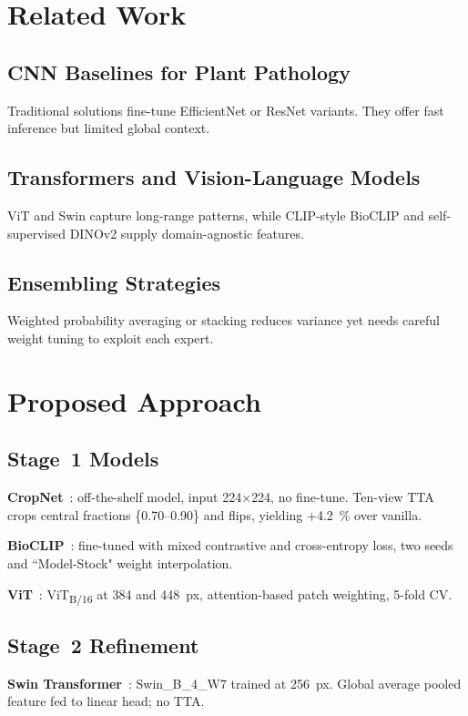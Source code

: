 \documentclass[10pt,conference]{IEEEtran}
\begin{document}
\section{Related Work}
\subsection{CNN Baselines for Plant Pathology}
Traditional solutions fine-tune EfficientNet or ResNet variants.  They offer fast inference but limited global context.

\subsection{Transformers and Vision-Language Models}
ViT and Swin capture long-range patterns, while CLIP-style BioCLIP and self-supervised DINOv2 supply domain-agnostic features.

\subsection{Ensembling Strategies}
Weighted probability averaging or stacking reduces variance yet needs careful weight tuning to exploit each expert.

\section{Proposed Approach}
\subsection{Stage~1 Models}
\textbf{CropNet}~\cite{CropNet2021}: off-the-shelf model, input 224$\times$224, no fine-tune.  Ten-view TTA crops central fractions \{0.70--0.90\} and flips, yielding +4.2~\% over vanilla.

\textbf{BioCLIP}~\cite{BioCLIP2024}: fine-tuned with mixed contrastive and cross-entropy loss, two seeds and ``Model-Stock" weight interpolation.

\textbf{ViT}~\cite{ViT2021}: ViT\textsubscript{B/16} at 384 and 448~px, attention-based patch weighting, 5-fold CV.

\subsection{Stage~2 Refinement}
\textbf{Swin Transformer}~\cite{Swin2021}: Swin\_B\_4\_W7 trained at 256~px.  Global average pooled feature fed to linear head; no TTA.
\end{document}
